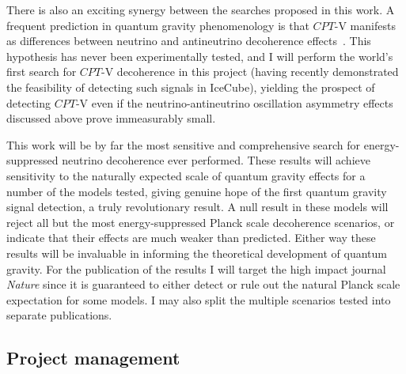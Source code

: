 \documentclass[a4paper,11pt]{article}
\begin{document}
There is also an exciting synergy between the searches proposed in this work. A frequent prediction in quantum gravity phenomenology is that $CPT$-V manifests as differences between neutrino and antineutrino decoherence effects~\cite{Mavromatos_2009, Barenboim:2004wu, Carrasco:2018sca, Buoninfante:2020iyr, Capolupo:2020myw}. This hypothesis has never been experimentally tested, and I will perform the world's first search for $CPT$-V decoherence in this project (having recently demonstrated the feasibility of detecting such signals in IceCube), yielding the prospect of detecting $CPT$-V even if the neutrino-antineutrino oscillation asymmetry effects discussed above prove immeasurably small.


This work will be by far the most sensitive and comprehensive search for energy-suppressed neutrino decoherence ever performed. These results will achieve sensitivity to the naturally expected scale of quantum gravity effects for a number of the models tested, giving genuine hope of the first quantum gravity signal detection, a truly revolutionary result. A null result in these models will reject all but the most energy-suppressed Planck scale decoherence scenarios, or indicate that their effects are much weaker than predicted. Either way these results will be invaluable in informing the theoretical development of quantum gravity. For the publication of the results I will target the high impact journal \textit{Nature} since it is guaranteed to either detect or rule out the natural Planck scale expectation for some models. I may also split the multiple scenarios tested into separate publications. \\


\subsection{Project management}
\end{document}
